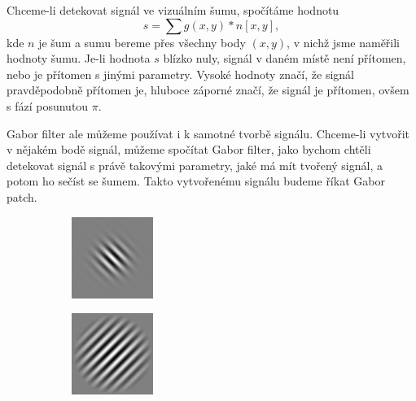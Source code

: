 Chceme-li detekovat signál ve vizuálním šumu, spočítáme hodnotu $$s=\sum g(x,y)*n[x,y],$$ kde $n$ je šum a sumu bereme přes všechny body $(x,y)$, v nichž jsme naměřili hodnoty šumu. Je-li hodnota $s$  blízko nuly, signál v daném místě
není přítomen, nebo je přítomen s jinými parametry. Vysoké hodnoty značí, že
signál pravděpodobně přítomen je, hluboce záporné značí, že signál je přítomen,
ovšem s fází posunutou $\pi$.

Gabor filter ale můžeme používat i k samotné tvorbě signálu. Chceme-li vytvořit
v nějakém bodě signál, můžeme spočítat Gabor filter, jako bychom chtěli
detekovat signál s právě takovými parametry, jaké má mít tvořený signál, a potom ho sečíst se šumem. Takto vytvořenému signálu budeme říkat
Gabor patch.

\begin{figure}[h!]
\begin{subfigure}{0.25\textwidth}
  \centering
  \includegraphics[width=.8\linewidth]{img/gabor1}
\end{subfigure}%
\begin{subfigure}{0.25\textwidth}
  \centering
  \includegraphics[width=.8\linewidth]{img/gabor2}

\end{subfigure}
\end{figure}

